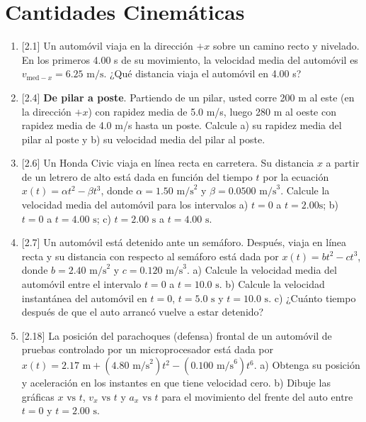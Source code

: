 \setcounter{page}{1}
\setcounter{figure}{0}
\setcounter{chapter}{2}

\chapter{Cantidades Cinemáticas}

\vspace{-15ex}
\begin{flushright}
\end{flushright}
\raggedright
{}
\begin{enumerate}
\item \textcolor{c5}{[2.1]} Un automóvil viaja en la dirección $+x$ sobre un camino recto y
nivelado. En los primeros 4.00 s de su movimiento, la velocidad
media del automóvil es $v_{\text{med}-x} = 6.25 \text{ m/s}$. ¿Qué distancia viaja el automóvil en 4.00 s?

\item \textcolor{c5}{[2.4]} \textbf{De pilar a poste}. Partiendo de un pilar, usted corre 200 m al este (en la dirección $+x$) con rapidez media de 5.0 m/s, luego
280 m al oeste con rapidez media de 4.0 m/s hasta un poste. Calcule a) su rapidez media del pilar al poste y b) su velocidad media del pilar al poste.

\item \textcolor{c5}{[2.6]} Un Honda Civic viaja en línea recta en carretera. Su distancia $x$ a partir de un letrero de alto está dada en función del tiempo $t$ por
la ecuación $x(t) = \alpha t^
2 - \beta t^
3$, donde $\alpha = 1.50 \text{ m/s}^2$ y $\beta = 0.0500 \text{ m/s}^3$.
Calcule la velocidad media del automóvil para los intervalos a) $t = 0$
a $t = 2.00 \text{s}$; b) $t = 0$ a $t = 4.00 \text{ s}$; c) $t = 2.00 \text{ s}$ a $t = 4.00 \text{ s}$.

\item \textcolor{c5}{[2.7]} Un automóvil está detenido ante un semáforo. Después,
viaja en línea recta y su distancia con respecto al semáforo está dada
por $x(t) = bt^2 - ct^3$, donde $b = 2.40 \text{ m/s}^2$ y $c = 0.120 \text{ m/s}^3$. a) Calcule la velocidad media del automóvil entre el intervalo $t = 0$ a $t = 10.0 \text{ s}$.
b) Calcule la velocidad instantánea del automóvil en $t = 0$, $t = 5.0 \text{ s}$ y
$t = 10.0 \text{ s}$. c) ¿Cuánto tiempo después de que el auto arrancó vuelve
a estar detenido?


\item \textcolor{c5}{[2.18]} La posición del parachoques (defensa) frontal de un automóvil de pruebas controlado por un microprocesador está dada por $x(t) = 2.17 \text{ m} + (4.80 \text{ m/s}^2)t^2 - (0.100 \text{ m/s}^6)t^6$. a) Obtenga su
posición y aceleración en los instantes en que tiene velocidad cero. b) Dibuje las gráficas $x\text{ vs }t$, $v_x\text{ vs }t$ y $a_x\text{ vs }t$ para el movimiento del frente
del auto entre $t = 0$ y $t = 2.00 \text{ s}$. 
\end{enumerate}


